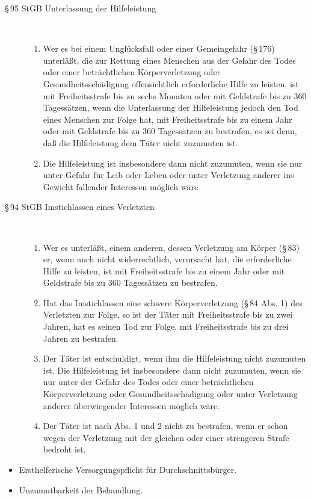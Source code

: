{{\begin{description}
  \item[{\S}\,95 StGB Unterlassung der Hilfeleistung] ~
  \begin{enumerate}
    \item[(1)] Wer es bei einem Unglücksfall oder einer
    Gemeingefahr ({\S}\,176) unterläßt, die zur Rettung
    eines Menschen aus der Gefahr des Todes oder einer
    beträchtlichen Körperverletzung oder
    Gesundheitsschädigung offensichtlich erforderliche Hilfe
    zu leisten, ist mit Freiheitsstrafe bis zu sechs Monaten
    oder mit Geldstrafe bis zu 360 Tagessätzen, wenn die
    Unterlassung der Hilfeleistung jedoch den Tod eines
    Menschen zur Folge hat, mit Freiheitsstrafe bis zu einem
    Jahr oder mit Geldstrafe bis zu 360 Tagessätzen zu
    bestrafen, es sei denn, daß die Hilfeleistung dem Täter
    nicht zuzumuten ist.
    \item[(2)] Die Hilfeleistung ist insbesondere dann nicht
    zuzumuten, wenn sie nur unter Gefahr für Leib oder Leben
    oder unter Verletzung anderer ins Gewicht fallender
    Interessen möglich
    wäre
  \end{enumerate}
  \item[{\S}\,94 StGB Imstichlassen eines Verletzten] ~
  \begin{enumerate}
    \item[(1)] Wer es unterläßt, einem anderen,
    dessen Verletzung am Körper ({\S}\,83) er, wenn auch nicht
    widerrechtlich, verursacht hat, die erforderliche Hilfe zu
    leisten, ist mit Freiheitsstrafe bis zu einem Jahr oder
    mit Geldstrafe bis zu 360 Tagessätzen zu bestrafen.
    \item[(2)] Hat das Imstichlassen eine schwere
    Körperverletzung ({\S}\,84 Abs. 1) des Verletzten zur Folge,
    so ist der Täter mit Freiheitsstrafe bis zu zwei Jahren,
    hat es seinen Tod zur Folge, mit Freiheitsstrafe bis zu
    drei Jahren zu bestrafen.
    \item[(3)]  Der Täter ist entschuldigt, wenn ihm die
    Hilfeleistung nicht zuzumuten ist. Die Hilfeleistung ist
    insbesondere dann nicht zuzumuten, wenn sie nur unter der
    Gefahr des Todes oder einer beträchtlichen
    Körperverletzung oder Gesundheitsschädigung oder unter
    Verletzung anderer überwiegender Interessen möglich wäre.
    \item[(4)] Der Täter ist nach Abs. 1 und 2 nicht zu
    bestrafen, wenn er schon wegen der Verletzung mit der
    gleichen oder einer strengeren Strafe bedroht ist.
  \end{enumerate}
\end{description}



}{
\begin{itemize}
  \item Ersthelferische Versorgungspflicht für
  Durchschnittsbürger. 
  \item Unzumutbarkeit der Behandlung. 
\end{itemize}
}{}{}{}    

}


